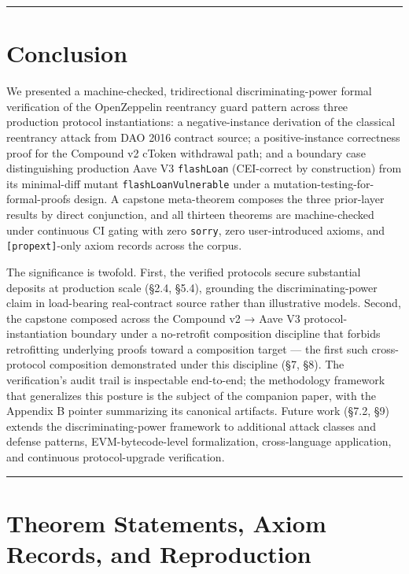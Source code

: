 \begin{center}\rule{0.5\linewidth}{0.5pt}\end{center}

\section{Conclusion}\label{conclusion}

We presented a machine-checked, tridirectional discriminating-power
formal verification of the OpenZeppelin reentrancy guard pattern across
three production protocol instantiations: a negative-instance derivation
of the classical reentrancy attack from DAO 2016 contract source; a
positive-instance correctness proof for the Compound v2 cToken
withdrawal path; and a boundary case distinguishing production Aave V3
\texttt{flashLoan} (CEI-correct by construction) from its minimal-diff
mutant \texttt{flashLoanVulnerable} under a
mutation-testing-for-formal-proofs design. A capstone meta-theorem
composes the three prior-layer results by direct conjunction, and all
thirteen theorems are machine-checked under continuous CI gating with
zero \texttt{sorry}, zero user-introduced axioms, and
\texttt{{[}propext{]}}-only axiom records across the corpus.

The significance is twofold. First, the verified protocols secure
substantial deposits at production scale (§2.4, §5.4), grounding the
discriminating-power claim in load-bearing real-contract source rather
than illustrative models. Second, the capstone composed across the
Compound v2 → Aave V3 protocol-instantiation boundary under a
no-retrofit composition discipline that forbids retrofitting underlying
proofs toward a composition target --- the first such cross-protocol
composition demonstrated under this discipline (§7, §8). The
verification's audit trail is inspectable end-to-end; the methodology
framework that generalizes this posture is the subject of the companion
paper, with the Appendix B pointer summarizing its canonical artifacts.
Future work (§7.2, §9) extends the discriminating-power framework to
additional attack classes and defense patterns, EVM-bytecode-level
formalization, cross-language application, and continuous
protocol-upgrade verification.

\begin{center}\rule{0.5\linewidth}{0.5pt}\end{center}

\appendices

\section{Theorem Statements, Axiom Records, and
Reproduction}\label{theorem-statements-axiom-records-and-reproduction}


